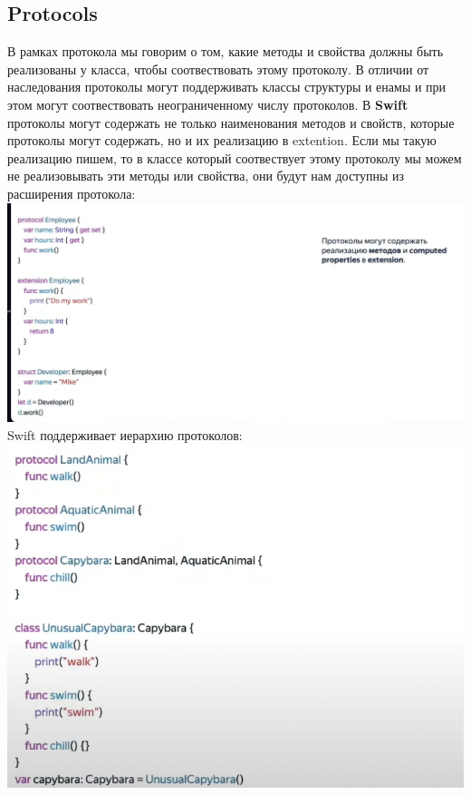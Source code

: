 \documentclass{article}
\begin{document}
    \subsection{Protocols}
    В рамках протокола мы говорим о том, какие методы и свойства должны быть реализованы у класса, чтобы соотвествовать этому протоколу. 
    \newline
    В отличии от наследования протоколы могут поддерживать классы структуры и енамы и при этом могут соотвествовать неограниченному числу протоколов. 
    \newline
    В \textbf{Swift} протоколы могут содержать не только наименования методов и свойств, которые протоколы могут содержать, но и их реализацию в extention. Если мы такую реализацию пишем, то в классе который соотвествует этому протоколу мы можем не реализовывать эти методы или свойства, они будут нам доступны из расширения протокола: 
    \newline
    \includegraphics[scale = 0.5]{pic/Снимок экрана 2023-07-27 в 23.48.50.png}
    \newline
    Swift поддерживает иерархию протоколов: 
    \newline
    \includegraphics[scale = 0.5]{pic/Снимок экрана 2023-07-27 в 23.49.39.png}
\end{document}
